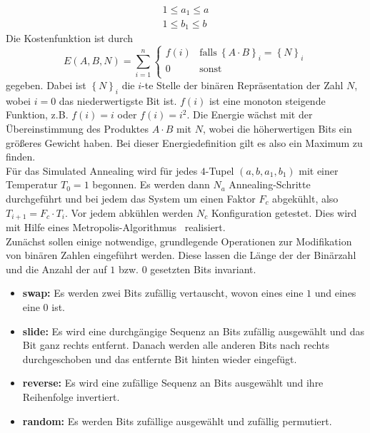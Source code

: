 \begin{align*}
		1\leq a_1\leq a \\
		1\leq b_1\leq b
\end{align*}
Die Kostenfunktion ist durch
\begin{equation*}
		E\left(A,B,N\right)=\sum\limits_{i=1}^n\begin{cases}
		  		f\left(i\right) & \mathrm{falls}\:{\left\{A\cdot B\right\}}_i={\left\{N\right\}}_i \\
						0 & \mathrm{sonst}\\
				\end{cases}
\end{equation*}
gegeben. Dabei ist ${\left\{N\right\}}_i$ die $i$-te Stelle der binären Repräsentation der Zahl $N$, wobei $i=0$ das niederwertigste Bit ist. $f\left(i\right)$ ist eine monoton steigende Funktion, z.B. $f\left(i\right)=i$ oder $f\left(i\right)=i^2$. Die Energie wächst mit der Übereinstimmung des Produktes $A\cdot B$ mit $N$, wobei die höherwertigen Bits ein größeres Gewicht haben. Bei dieser Energiedefinition gilt es also ein Maximum zu finden. \\
Für das Simulated Annealing wird für jedes $4$-Tupel $\left(a,b,a_1,b_1\right)$ mit einer Temperatur $T_0=1$ begonnen. Es werden dann $N_a$ Annealing-Schritte durchgeführt und bei jedem das System um einen Faktor $F_c$ abgekühlt, also $T_{i+1}=F_c\cdot T_i$. Vor jedem abkühlen werden $N_c$ Konfiguration getestet. Dies wird mit Hilfe eines Metropolis-Algorithmus~\parencite{metropolis} realisiert. \\
Zunächst sollen einige notwendige, grundlegende Operationen zur Modifikation von binären Zahlen eingeführt werden. Diese lassen die Länge der der Binärzahl und die Anzahl der auf $1$ bzw. $0$ gesetzten Bits invariant.
\begin{itemize}
		\item \textbf{swap:} Es werden zwei Bits zufällig vertauscht, wovon eines eine $1$ und eines eine $0$ ist.
		\item \textbf{slide:} Es wird eine durchgängige Sequenz an Bits zufällig ausgewählt und das Bit ganz rechts entfernt. Danach werden alle anderen Bits nach rechts durchgeschoben und das entfernte Bit hinten wieder eingefügt.
		\item \textbf{reverse:} Es wird eine zufällige Sequenz an Bits ausgewählt und ihre Reihenfolge invertiert.
		\item \textbf{random:} Es werden Bits zufällige ausgewählt und zufällig permutiert.
\end{itemize}
